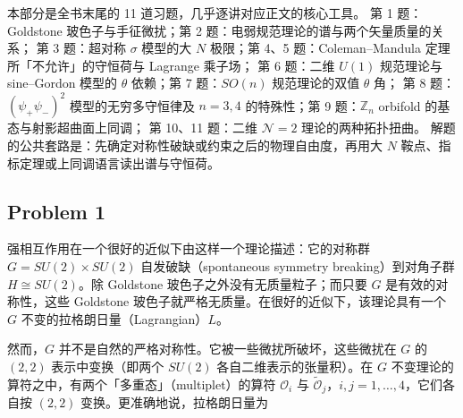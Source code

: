 
\begin{keytakeaways}
本部分是全书末尾的 11 道习题，几乎逐讲对应正文的核心工具。
第 1 题：Goldstone 玻色子与手征微扰；第 2 题：电弱规范理论的谱与两个矢量质量的关系；
第 3 题：超对称 $\sigma$ 模型的大 $N$ 极限；第 4、5 题：Coleman–Mandula 定理所「不允许」的守恒荷与 Lagrange 乘子场；
第 6 题：二维 $U(1)$ 规范理论与 sine–Gordon 模型的 $\theta$ 依赖；第 7 题：$SO(n)$ 规范理论的双值 $\theta$ 角；
第 8 题：$(\psi_+\psi_-)^2$ 模型的无穷多守恒律及 $n=3,4$ 的特殊性；第 9 题：$\mathbb{Z}_n$ orbifold 的基态与射影超曲面上同调；
第 10、11 题：二维 $\mathcal{N}=2$ 理论的两种拓扑扭曲。
解题的公共套路是：先确定对称性破缺或约束之后的物理自由度，再用大 $N$ 鞍点、指标定理或上同调语言读出谱与守恒荷。
\end{keytakeaways}


\subsection*{Problem 1}

强相互作用在一个很好的近似下由这样一个理论描述：它的对称群 $G=SU(2)\times SU(2)$ 自发破缺（spontaneous symmetry breaking）到对角子群 $H\cong SU(2)$。除 Goldstone 玻色子之外没有无质量粒子；而只要 $G$ 是有效的对称性，这些 Goldstone 玻色子就严格无质量。在很好的近似下，该理论具有一个 $G$ 不变的拉格朗日量（Lagrangian）$L$。

然而，$G$ 并不是自然的严格对称性。它被一些微扰所破坏，这些微扰在 $G$ 的 $(2,2)$ 表示中变换（即两个 $SU(2)$ 各自二维表示的张量积）。在 $G$ 不变理论的算符之中，有两个「多重态」（multiplet）的算符 $\mathcal{O}_i$ 与 $\widetilde{\mathcal{O}}_j$，$i,j=1,\dots,4$，它们各自按 $(2,2)$ 变换。更准确地说，拉格朗日量为

